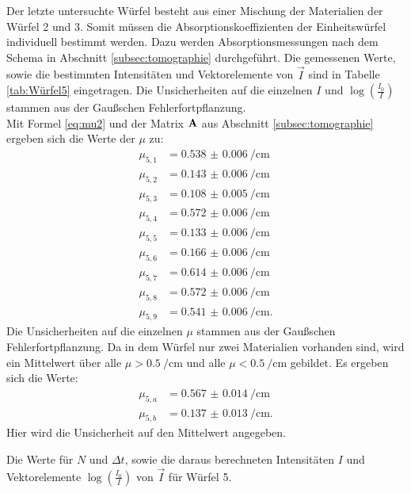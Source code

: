 Der letzte untersuchte Würfel besteht aus einer Mischung der Materialien der Würfel 2 und 3. Somit müssen die Absorptionskoeffizienten der Einheitswürfel individuell bestimmt werden. Dazu werden Absorptionsmessungen nach dem Schema in Abschnitt \ref{subsec:tomographie} durchgeführt. Die gemessenen Werte, sowie die bestimmten Intensitäten und Vektorelemente von $\vec{I}$ sind in Tabelle \ref{tab:Würfel5} eingetragen. Die Unsicherheiten auf die einzelnen $I$ und $\log\left(\frac{I_0}{I}\right)$ stammen aus der Gaußschen Fehlerfortpflanzung.\\
Mit Formel \eqref{eq:mu2} und der Matrix $\bold{A}$ aus Abschnitt \ref{subsec:tomographie} ergeben sich die Werte der $\mu$ zu:
\begin{align*}
\mu_{5,1} &= \SI{0.538(6)}{\per\centi\metre}\\
\mu_{5,2} &= \SI{0.143(6)}{\per\centi\metre}\\
\mu_{5,3} &= \SI{0.108(5)}{\per\centi\metre}\\
\mu_{5,4} &= \SI{0.572(6)}{\per\centi\metre}\\
\mu_{5,5} &= \SI{0.133(6)}{\per\centi\metre}\\
\mu_{5,6} &= \SI{0.166(6)}{\per\centi\metre}\\
\mu_{5,7} &= \SI{0.614(6)}{\per\centi\metre}\\
\mu_{5,8} &= \SI{0.572(6)}{\per\centi\metre}\\
\mu_{5,9} &= \SI{0.541(6)}{\per\centi\metre}\text{.}
\end{align*}
Die Unsicherheiten auf die einzelnen $\mu$ stammen aus der Gaußschen Fehlerfortpflanzung.
Da in dem Würfel nur zwei Materialien vorhanden sind, wird ein Mittelwert über alle $\mu >\SI{0.5}{\per\centi\metre}$ und alle $\mu <\SI{0.5}{\per\centi\metre}$ gebildet. Es ergeben sich die Werte:
\begin{align*}
\mu_{5,a} &= \SI{0.567(14)}{\per\centi\metre}\\
\mu_{5,b} &= \SI{0.137(13)}{\per\centi\metre}\text{.}
\end{align*}
Hier wird die Unsicherheit auf den Mittelwert angegeben.

\begin{table}
	\centering
	\caption{Die Werte für $N$ und $\Delta t$, sowie die daraus berechneten Intensitäten $I$ und Vektorelemente $\log\left(\frac{I_0}{I}\right)$ von $\vec{I}$ für Würfel 5.}
	
	\label{tab:Würfel5}
\end{table}
